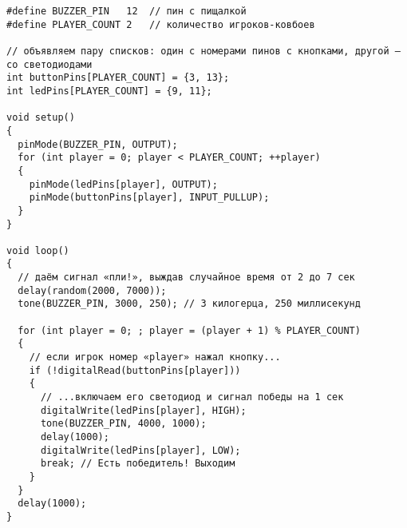 \documentclass{lab}
\begin{document}
\begin{verbatim}
#define BUZZER_PIN   12  // пин с пищалкой
#define PLAYER_COUNT 2   // количество игроков-ковбоев

// объявляем пару списков: один с номерами пинов с кнопками, другой — со светодиодами
int buttonPins[PLAYER_COUNT] = {3, 13};
int ledPins[PLAYER_COUNT] = {9, 11};

void setup()
{  
  pinMode(BUZZER_PIN, OUTPUT);
  for (int player = 0; player < PLAYER_COUNT; ++player)
  {
    pinMode(ledPins[player], OUTPUT);
    pinMode(buttonPins[player], INPUT_PULLUP);
  }
}

void loop()
{
  // даём сигнал «пли!», выждав случайное время от 2 до 7 сек
  delay(random(2000, 7000));
  tone(BUZZER_PIN, 3000, 250); // 3 килогерца, 250 миллисекунд

  for (int player = 0; ; player = (player + 1) % PLAYER_COUNT)
  {
    // если игрок номер «player» нажал кнопку...
    if (!digitalRead(buttonPins[player]))
    {
      // ...включаем его светодиод и сигнал победы на 1 сек
      digitalWrite(ledPins[player], HIGH);
      tone(BUZZER_PIN, 4000, 1000);
      delay(1000);
      digitalWrite(ledPins[player], LOW);
      break; // Есть победитель! Выходим
    }
  }
  delay(1000);
}
\end{verbatim}
\end{document}
